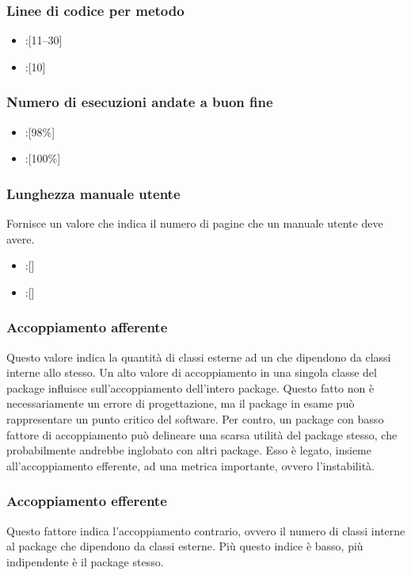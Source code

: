 \subsubsection{Linee di codice per metodo}
\begin{itemize}
\item {}:[11--30]
\item {}:[10]
\end{itemize}

\subsubsection{Numero di esecuzioni andate a buon fine}
\begin{itemize}
\item {}:[98\%]
\item {}:[100\%]
\end{itemize}

\subsubsection{Lunghezza manuale utente}
Fornisce un valore che indica il numero di pagine che un manuale utente deve avere.
\begin{itemize}
\item {}:[]
\item {}:[]
\end{itemize}

\subsubsection{Accoppiamento afferente}
Questo valore indica la quantità di classi esterne ad un  che dipendono da classi interne allo stesso.
Un alto valore di accoppiamento in una singola classe del package influisce sull'accoppiamento dell'intero package. Questo fatto non è necessariamente un errore di progettazione, ma il package in esame può rappresentare un punto critico del software. Per contro, un package con basso fattore di accoppiamento può delineare una scarsa utilità del package stesso, che probabilmente andrebbe inglobato con altri package. Esso è legato, insieme all'accoppiamento efferente, ad una metrica importante, ovvero l'instabilità.

\subsubsection{Accoppiamento efferente}
Questo fattore indica l'accoppiamento contrario, ovvero il numero di classi interne al package che dipendono da classi esterne. Più questo indice è basso, più indipendente è il package stesso.

